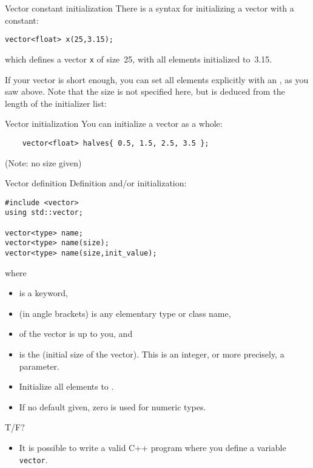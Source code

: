 \begin{slide}{Vector constant initialization}
  \label{sl:vector-initconst}
  There is a syntax for initializing a vector with a constant:
\begin{lstlisting}
vector<float> x(25,3.15);
\end{lstlisting}
which defines a vector \lstinline{x} of size~25,
with all elements initialized to~3.15.
\end{slide}

If your vector is short enough, you can set all elements explicitly with an
, as you saw above.
Note that the size is not specified here,
but is deduced from the length of the initializer list:


\begin{slide}{Vector initialization}
  \label{sl:vector-init}
  You can initialize a vector as a whole:
  \begin{lstlisting}
    vector<float> halves{ 0.5, 1.5, 2.5, 3.5 };
  \end{lstlisting}
  (Note: no size given)
\end{slide}

\begin{slide}{Vector definition}
  \label{sl:vector-def}
  Definition and/or initialization:
  \lstset{style=snippetcode}
\begin{lstlisting}
#include <vector>
using std::vector;

vector<type> name;
vector<type> name(size);
vector<type> name(size,init_value);
\end{lstlisting}
where
\begin{itemize}
\item {} is a keyword,
\item {} (in angle brackets) is any elementary type or class
  name,
\item {} of the vector is up to you, and
\item {} is the (initial size of the vector). This is an integer,
  or more precisely, a  parameter.
\item Initialize all elements to .
\item If no default given, zero is used for numeric types.
\end{itemize}
\end{slide}

\begin{review}
  T/F? 
  \begin{itemize}
  \item It is possible to write a valid C++ program where you define a
    variable \lstinline+vector+.
  \end{itemize}
\end{review}


